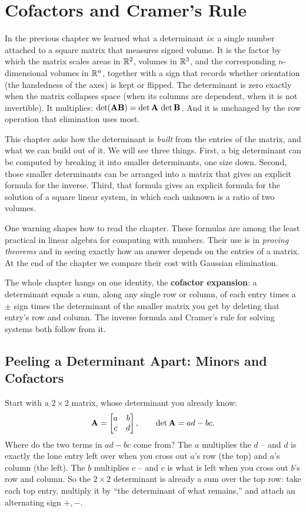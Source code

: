 \chapter{Cofactors and Cramer's Rule}

In the previous chapter we learned what a determinant \emph{is}: a single number attached to a square
matrix that measures signed volume. It is the factor by which the matrix scales areas in $\mathbb{R}^2$,
volumes in $\mathbb{R}^3$, and the corresponding $n$-dimensional volumes in $\mathbb{R}^n$, together with a sign
that records whether orientation (the handedness of the axes) is kept or flipped. The determinant is
zero exactly when the matrix collapses space (when its columns are dependent, when it is not
invertible). It multiplies: $\det(\mathbf{A} \mathbf{B})=\det\mathbf{A}\,\det\mathbf{B}$. And it is unchanged by the
row operation that elimination uses most.

This chapter asks how the determinant is \emph{built} from the entries of the matrix, and what we can
build out of it. We will see three things. First, a big determinant can be computed by breaking it
into smaller determinants, one size down. Second, those smaller determinants can be arranged into a
matrix that gives an explicit formula for the inverse. Third, that formula gives an explicit formula
for the solution of a square linear system, in which each unknown is a ratio of two volumes.

One warning shapes how to read the chapter. These formulas are among the least practical in linear
algebra for computing with numbers. Their use is in \emph{proving theorems} and in seeing exactly how
an answer depends on the entries of a matrix. At the end of the chapter we compare their cost with
Gaussian elimination.

\begin{focusbox}
The whole chapter hangs on one identity, the \textbf{cofactor expansion}: a determinant equals a
sum, along any single row or column, of each entry times a $\pm$ sign times the determinant of the
smaller matrix you get by deleting that entry's row and column. The inverse formula and Cramer's
rule for solving systems both follow from it.
\end{focusbox}

\section{Peeling a Determinant Apart: Minors and Cofactors}

Start with a $2\times2$ matrix, whose determinant you already know:
\[
\mathbf{A}=\begin{bmatrix} a & b \\ c & d \end{bmatrix},\qquad \det\mathbf{A} = ad-bc.
\]
Where do the two terms in $ad-bc$ come from? The $a$ multiplies the $d$ -- and $d$ is
exactly the lone entry left over when you cross out $a$'s row (the top) and $a$'s column (the left).
The $b$ multiplies $c$ -- and $c$ is what is left when you cross out $b$'s row and column. So the
$2\times2$ determinant is already a sum over the top row: take each top entry, multiply it by ``the
determinant of what remains,'' and attach an alternating sign $+,-$.

